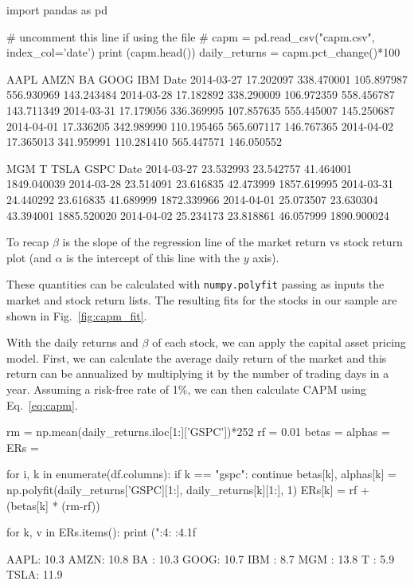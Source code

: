 \begin{ipython}
import pandas as pd

# uncomment this line if using the file
# capm = pd.read_csv("capm.csv", index_col='date')
print (capm.head())
daily_returns = capm.pct_change()*100
\end{ipython}
\begin{ioutput}
                 AAPL        AMZN          BA        GOOG         IBM
Date                                                                    
2014-03-27  17.202097  338.470001  105.897987  556.930969  143.243484   
2014-03-28  17.182892  338.290009  106.972359  558.456787  143.711349   
2014-03-31  17.179056  336.369995  107.857635  555.445007  145.250687   
2014-04-01  17.336205  342.989990  110.195465  565.607117  146.767365   
2014-04-02  17.365013  341.959991  110.281410  565.447571  146.050552   

                  MGM          T       TSLA         GSPC  
Date                                                      
2014-03-27  23.532993  23.542757  41.464001  1849.040039  
2014-03-28  23.514091  23.616835  42.473999  1857.619995  
2014-03-31  24.440292  23.616835  41.689999  1872.339966  
2014-04-01  25.073507  23.630304  43.394001  1885.520020  
2014-04-02  25.234173  23.818861  46.057999  1890.900024  
\end{ioutput}

To recap $\beta$ is the slope of the regression line of the market return vs stock return plot (and $\alpha$ is the intercept of this line with the $y$ axis).

These quantities can be calculated with \texttt{numpy.polyfit} passing as inputs the market and stock return lists. 
The resulting fits for the stocks in our sample are shown in Fig.~\ref{fig:capm_fit}.

With the daily returns and $\beta$ of each stock, we can apply the capital asset pricing model. First, we can calculate the average daily return of the market and this return can be annualized by multiplying it by the number of trading days in a year.
Assuming a risk-free rate of 1\%, we can then calculate CAPM using Eq.~\ref{eq:capm}.

\begin{ipython}
rm = np.mean(daily_returns.iloc[1:]['GSPC'])*252
rf = 0.01
betas = {}
alphas = {}
ERs = {}

for i, k in enumerate(df.columns):
    if k == "gspc":
        continue
    betas[k], alphas[k] = np.polyfit(daily_returns['GSPC][1:],
    daily_returns[k][1:], 1)
    ERs[k] = rf + (betas[k] * (rm-rf))

for k, v in ERs.items():
    print ("{:4}: {:4.1f}%
\end{ipython}
\begin{ioutput}
AAPL: 10.3%
AMZN: 10.8%
BA  : 10.3%
GOOG: 10.7%
IBM :  8.7%
MGM : 13.8%
T   :  5.9%
TSLA: 11.9%
\end{ioutput}

